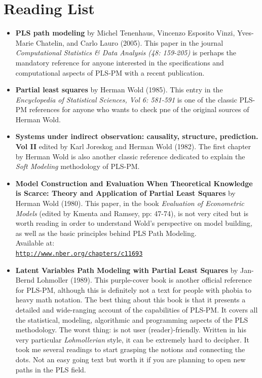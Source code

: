 \documentclass[12pt]{book}\usepackage{graphicx, color}
\begin{document}
\section{Reading List}
\begin{itemize}
 \vspace{2mm}
 \item \textbf{\textsf{PLS path modeling}} by Michel Tenenhaus, Vincenzo Esposito Vinzi, Yves-Marie Chatelin, and Carlo Lauro (2005). This paper in the journal \textit{Computational Statistics \& Data Analysis (48: 159-205)} is perhaps the mandatory reference for anyone interested in the specifications and computational aspects of PLS-PM with a recent publication.
 
\vspace{2mm}
 \item \textbf{\textsf{Partial least squares}} by Herman Wold (1985). This entry in the \textit{Encyclopedia of Statistical Sciences, Vol 6: 581-591} is one of the classic PLS-PM references for anyone who wants to check pne of the original sources of Herman Wold.

 \vspace{2mm}
 \item \textbf{\textsf{Systems under indirect observation: causality, structure, prediction. Vol II}} edited by Karl Joreskog and Herman Wold (1982). The first chapter by Herman Wold is also another classic reference dedicated to explain the \textit{Soft Modeling} methodology of PLS-PM.

 \vspace{2mm}
 \item \textbf{\textsf{Model Construction and Evaluation When Theoretical Knowledge is Scarce: Theory and Application of Partial Least Squares}} by Herman Wold (1980). This paper, in the book \textit{Evaluation of Econometric Models} (edited by Kmenta and Ramsey, pp: 47-74), is not very cited but is worth reading in order to understand Wold's perspective on model building, as well as the basic principles behind PLS Path Modeling. \\
 Available at: \\
 \texttt{\href{http://www.nber.org/chapters/c11693}{http://www.nber.org/chapters/c11693}}

 \vspace{2mm}
 \item \textbf{\textsf{Latent Variables Path Modeling with Partial Least Squares}} by Jan-Bernd Lohmoller (1989). This purple-cover book is another official reference for PLS-PM, although this is definitely not a text for people with phobia to heavy math notation. The best thing about this book is that it presents a detailed and wide-ranging account of the capabilities of PLS-PM. It covers all the statistical, modeling, algorithmic and programming aspects of the PLS methodology. The worst thing: is not user (reader)-friendly. Written in his very particular \textit{Lohmollerian} style, it can be extremely hard to decipher. It took me several readings to start grasping the notions and connecting the dots. Not an easy going text but worth it if you are planning to open new paths in the PLS field. 
 
\end{itemize}
\end{document}
